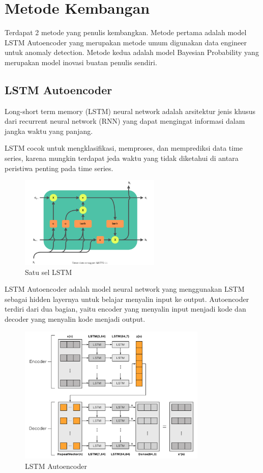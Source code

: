 \chapter{Metode Kembangan}

Terdapat 2 metode yang penulis kembangkan. Metode pertama adalah model LSTM Autoencoder yang merupakan metode umum digunakan data engineer untuk anomaly detection. Metode kedua adalah model Bayesian Probability yang merupakan model inovasi buatan penulis sendiri.

\section{LSTM Autoencoder}

Long-short term memory (LSTM) neural network adalah arsitektur jenis khusus dari recurrent neural network (RNN) yang dapat mengingat informasi dalam jangka waktu yang panjang.

LSTM cocok untuk mengklasifikasi, memproses, dan memprediksi data time series, karena mungkin terdapat jeda waktu yang tidak diketahui di antara peristiwa penting pada time series.

\begin{figure}[h]
    \centering
    \includegraphics[width=0.6\textwidth]{resources/LSTM/LSTM_cell.png}
    \caption{Satu sel LSTM}
\end{figure}

LSTM Autoencoder adalah model neural network yang menggunakan LSTM sebagai hidden layernya untuk belajar menyalin input ke output. Autoencoder terdiri dari dua bagian, yaitu encoder yang menyalin input menjadi kode dan decoder yang menyalin kode menjadi output.

\begin{figure}[h]
    \centering
    \includegraphics[width=0.8\textwidth]{resources/LSTM/lstm_ae.png}
    \caption{LSTM Autoencoder}
\end{figure}

